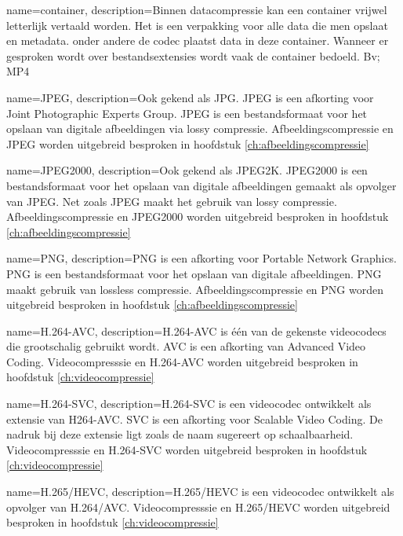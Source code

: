 {
	name={container},
	description={Binnen datacompressie kan een container vrijwel letterlijk vertaald worden. Het is een verpakking voor alle data die men opslaat en metadata. onder andere de codec plaatst data in deze container. Wanneer er gesproken wordt over bestandsextensies wordt vaak de container bedoeld. Bv; MP4 }
}

{
	name={JPEG},
	description={Ook gekend als JPG. JPEG is een afkorting voor Joint Photographic Experts Group. JPEG is een bestandsformaat voor het opslaan van digitale afbeeldingen via lossy compressie. Afbeeldingscompressie en JPEG worden uitgebreid besproken in hoofdstuk \ref{ch:afbeeldingscompressie}}
}

{
	name={JPEG2000},
	description={Ook gekend als JPEG2K. JPEG2000 is een bestandsformaat voor het opslaan van digitale afbeeldingen gemaakt als opvolger van JPEG. Net zoals JPEG maakt het gebruik van lossy compressie. Afbeeldingscompressie en JPEG2000 worden uitgebreid besproken in hoofdstuk \ref{ch:afbeeldingscompressie}}
}

{
	name={PNG},
	description={PNG is een afkorting voor Portable Network Graphics. PNG is een bestandsformaat voor het opslaan van digitale afbeeldingen. PNG maakt gebruik van lossless compressie. Afbeeldingscompressie en PNG worden uitgebreid besproken in hoofdstuk \ref{ch:afbeeldingscompressie}}
}

{
	name={H.264-AVC},
	description={H.264-AVC is één van de gekenste videocodecs die grootschalig gebruikt wordt. AVC is een afkorting van Advanced Video Coding. Videocompresssie en H.264-AVC worden uitgebreid besproken in hoofdstuk \ref{ch:videocompressie}}
}

{
	name={H.264-SVC},
	description={H.264-SVC is een videocodec ontwikkelt als extensie van H264-AVC. SVC is een afkorting voor Scalable Video Coding. De nadruk bij deze extensie ligt zoals de naam sugereert op schaalbaarheid. Videocompresssie en H.264-SVC worden uitgebreid besproken in hoofdstuk \ref{ch:videocompressie}}
}

{
	name={H.265/HEVC},
	description={H.265/HEVC is een videocodec ontwikkelt als opvolger van H.264/AVC. Videocompresssie en H.265/HEVC worden uitgebreid besproken in hoofdstuk \ref{ch:videocompressie}}
}

